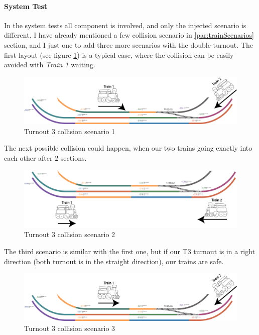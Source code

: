 \paragraph{System Test}
In the system tests all component is involved, and only the injected scenario is different. 
I have already mentioned a few collision scenario in \ref{par:trainScenarios} section, and I just one to add three more scenarios with the double-turnout. The first layout (see figure \ref{fig:LayoutT3-scenario1}) is a typical case, where the collision can be easily avoided with \textit{Train 1} waiting.
\begin{figure}[!h]
	\centering
	\includegraphics[width=150mm, keepaspectratio]{figures/modes3/layoutT3-scenario1.png}
	\caption{Turnout 3 collision scenario 1}
	\label{fig:LayoutT3-scenario1}
\end{figure}

The next possible collision could happen, when our two trains going exactly into each other after 2 sections.
\begin{figure}[!h]
	\centering
	\includegraphics[width=150mm, keepaspectratio]{figures/modes3/layoutT3-scenario2.png}
	\caption{Turnout 3 collision scenario 2}
	\label{fig:LayoutT3-scenario2}
\end{figure}

The third scenario is similar with the first one, but if our T3 turnout is in a right direction (both turnout is in the straight direction), our trains are safe.
\begin{figure}[!h]
	\centering
	\includegraphics[width=150mm, keepaspectratio]{figures/modes3/layoutT3-scenario3.png}
	\caption{Turnout 3 collision scenario 3}
	\label{fig:LayoutT3-scenario3}
\end{figure}